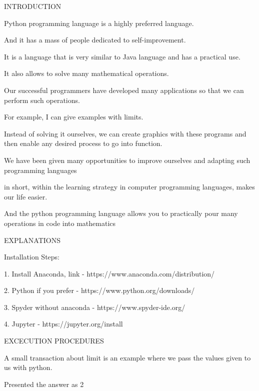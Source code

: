 \documentclass[11pt] {article}
\begin{document}
\vspace{150mm} %
\begin{center}
INTRODUCTION

Python programming language is a highly preferred language. 

And it has a mass of people dedicated to self-improvement.

It is a language that is very similar to Java language and has a practical use. 

It also allows to solve many mathematical operations. 

Our successful programmers have developed many applications so that we can perform such operations. 

For example, I can give examples with limits. 

Instead of solving it ourselves, we can create graphics with these programs and then enable any desired process to go into function.

We have been given many opportunities to improve ourselves and adapting such programming languages 

in short, within the learning strategy in computer programming languages, makes our life easier. 

And the python programming language allows you to practically pour many operations in code into mathematics
\end{center}

\vspace{150mm} %
\begin{center}
EXPLANATIONS

Installation Steps:

1.	Install Anaconda, link - https://www.anaconda.com/distribution/ 

2.	Python if you prefer - https://www.python.org/downloads/

3.	Spyder without anaconda - https://www.spyder-ide.org/

4.	Jupyter - https://jupyter.org/install
\end{center}

\vspace{60mm} %
\begin{center}
EXCECUTION PROCEDURES
\end{center}

\begin{center}
A small transaction about limit is an example where we pass the values given to us with python. 

Presented the answer as 2
\end{center}
\end{document}
